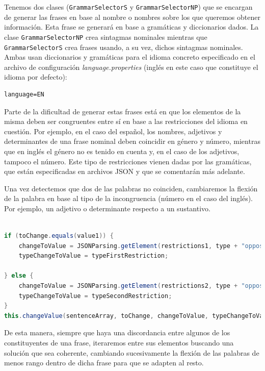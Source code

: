 Tenemos dos clases (\texttt{GrammarSelectorS} y \texttt{GrammarSelectorNP}) que se encargan de generar las frases en base al nombre o nombres sobre los que queremos obtener información. Esta frase se generará en base a gramáticas y diccionarios dados. La clase \texttt{GrammarSelectorNP} crea sintagmas nominales mientras que \texttt{GrammarSelectorS} crea frases usando, a su vez, dichos sintagmas nominales. Ambas usan diccionarios y gramáticas para el idioma concreto especificado en el archivo de configuración \textit{language.properties} (inglés en este caso que constituye el idioma por defecto):

\begin{verbatim}
language=EN
\end{verbatim}

\noindent Parte de la dificultad de generar estas frases está en que los elementos de la misma deben ser congruentes entre sí en base a las restricciones del idioma en cuestión. Por ejemplo, en el caso del español, los nombres, adjetivos y determinantes de una frase nominal deben coincidir en género y número, mientras que en inglés el género no es tenido en cuenta y, en el caso de los adjetivos, tampoco el número. Este tipo de restricciones vienen dadas por las gramáticas, que están especificadas en archivos JSON y que se comentarán más adelante.

Una vez detectemos que dos de las palabras no coinciden, cambiaremos la flexión de la palabra en base al tipo de la incongruencia (número en el caso del inglés). Por ejemplo, un adjetivo o determinante respecto a un sustantivo.

\begin{lstlisting}[language=java]

if (toChange.equals(value1)) {
    changeToValue = JSONParsing.getElement(restrictions1, type + "opposite");
    typeChangeToValue = typeFirstRestriction; 
     
} else {
    changeToValue = JSONParsing.getElement(restrictions2, type + "opposite");
    typeChangeToValue = typeSecondRestriction;
}
this.changeValue(sentenceArray, toChange, changeToValue, typeChangeToValue);

\end{lstlisting}

\noindent De esta manera, siempre que haya una discordancia entre algunos de los constituyentes de una frase, iteraremos entre sus elementos buscando una solución que sea coherente, cambiando sucesivamente la flexión de las palabras de menos rango dentro de dicha frase para que se adapten al resto.

